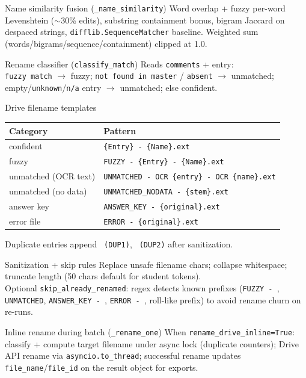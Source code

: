 \documentclass[aspectratio=169]{beamer}
\begin{document}
\begin{frame}{Name similarity fusion (\texttt{\_name\_similarity})}
  \tiny
  Word overlap + fuzzy per-word Levenshtein ($\sim$30\% edits), substring containment bonus, bigram Jaccard on despaced strings, \texttt{difflib.SequenceMatcher} baseline. Weighted sum (words/bigrams/sequence/containment) clipped at 1.0.
\end{frame}

\begin{frame}{Rename classifier (\texttt{classify\_match})}
  \small
  Reads \texttt{comments} + entry:\\
  \texttt{fuzzy match} $\rightarrow$ fuzzy; \texttt{not found in master} / \texttt{absent} $\rightarrow$ unmatched; empty/\texttt{unknown}/\texttt{n/a} entry $\rightarrow$ unmatched; else confident.
\end{frame}

\begin{frame}{Drive filename templates}
  \tiny
  \begin{tabular}{@{}ll@{}}
    \toprule
    Category & Pattern \\
    \midrule
    confident & \texttt{\{Entry\} - \{Name\}.ext} \\
    fuzzy & \texttt{FUZZY - \{Entry\} - \{Name\}.ext} \\
    unmatched (OCR text) & \texttt{UNMATCHED - OCR \{entry\} - OCR \{name\}.ext} \\
    unmatched (no data) & \texttt{UNMATCHED\_NODATA - \{stem\}.ext} \\
    answer key & \texttt{ANSWER\_KEY - \{original\}.ext} \\
    error file & \texttt{ERROR - \{original\}.ext} \\
    \bottomrule
  \end{tabular}
\vfill
\tiny Duplicate entries append \texttt{ (DUP1)}, \texttt{ (DUP2)} after sanitization.
\end{frame}

\begin{frame}{Sanitization + skip rules}
  \small
  Replace unsafe filename chars; collapse whitespace; truncate length (50 chars default for student tokens).\\
  Optional \texttt{skip\_already\_renamed}: regex detects known prefixes (\texttt{FUZZY - }, \texttt{UNMATCHED}, \texttt{ANSWER\_KEY - }, \texttt{ERROR - }, roll-like prefix) to avoid rename churn on re-runs.
\end{frame}

\begin{frame}{Inline rename during batch (\texttt{\_rename\_one})}
  \small
  When \texttt{rename\_drive\_inline=True}: classify + compute target filename under async lock (duplicate counters); Drive API rename via \texttt{asyncio.to\_thread}; successful rename updates \texttt{file\_name}/\texttt{file\_id} on the result object for exports.
\end{frame}
\end{document}
